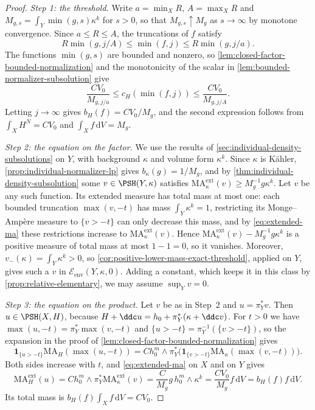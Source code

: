 \begin{proof}
\emph{Step 1: the threshold.} Write $a=\min_XR$, $A=\max_XR$ and $M_{g,s}=\int_Y\min(g,s)\kappa^k$ for $s>0$, so that $M_{g,s}\uparrow M_g$ as $s\to\infty$ by monotone convergence. Since $a\leq R\leq A$, the truncations of $f$ satisfy
\[
 R\min(g,j/A)\leq\min(f,j)\leq R\min(g,j/a).
\]
The functions $\min(g,s)$ are bounded and nonzero, so \cref{lem:closed-factor-bounded-normalization} and the monotonicity of the scalar in \cref{lem:bounded-normalizer-subsolution} give
\[
 \frac{CV_0}{M_{g,j/a}}\leq c_H(\min(f,j))\leq\frac{CV_0}{M_{g,j/A}}.
\]
Letting $j\to\infty$ gives $b_H(f)=CV_0/M_g$, and the second expression follows from $\int_XH^N=CV_0$ and $\int_Xf\,\mathrm{d}V=M_g$.

\emph{Step 2: the equation on the factor.} We use the results of \cref{sec:individual-density-subsolutions} on $Y$, with background $\kappa$ and volume form $\kappa^k$. Since $\kappa$ is K\"ahler, \cref{prop:individual-normalizer-lp} gives $b_\kappa(g)=1/M_g$, and by \cref{thm:individual-density-subsolution} some $v\in\PSH(Y,\kappa)$ satisfies $\mathrm{MA}^{\mathrm{ext}}_\kappa(v)\geq M_g^{-1}g\kappa^k$. Let $v$ be any such function. Its extended measure has total mass at most one: each bounded truncation $\max(v,-t)$ has mass $\int_Y\kappa^k=1$, restricting its Monge--Amp\`ere measure to $\{v>-t\}$ can only decrease this mass, and by \eqref{eq:extended-ma} these restrictions increase to $\mathrm{MA}^{\mathrm{ext}}_\kappa(v)$. Hence $\mathrm{MA}^{\mathrm{ext}}_\kappa(v)-M_g^{-1}g\kappa^k$ is a positive measure of total mass at most $1-1=0$, so it vanishes. Moreover, $v_-(\kappa)=\int_Y\kappa^k>0$, so \cref{cor:positive-lower-mass-exact-threshold}, applied on $Y$, gives such a $v$ in $\mathcal E_{\mathrm{env}}(Y,\kappa,0)$. Adding a constant, which keeps it in this class by \cref{prop:relative-elementary}, we may assume $\sup_Yv=0$.

\emph{Step 3: the equation on the product.} Let $v$ be as in Step~2 and $u=\pi_Y^*v$. Then $u\in\PSH(X,H)$, because $H+\ddc u=h_0+\pi_Y^*(\kappa+\ddc v)$. For $t>0$ we have $\max(u,-t)=\pi_Y^*\max(v,-t)$ and $\{u>-t\}=\pi_Y^{-1}(\{v>-t\})$, so the expansion in the proof of \cref{lem:closed-factor-bounded-normalization} gives
\[
 \mathbf1_{\{u>-t\}}\mathrm{MA}_H(\max(u,-t))
 =Ch_0^m\wedge\pi_Y^*\bigl(\mathbf1_{\{v>-t\}}\mathrm{MA}_\kappa(\max(v,-t))\bigr).
\]
Both sides increase with $t$, and \eqref{eq:extended-ma} on $X$ and on $Y$ gives
\[
 \mathrm{MA}^{\mathrm{ext}}_H(u)=Ch_0^m\wedge\pi_Y^*\mathrm{MA}^{\mathrm{ext}}_\kappa(v)
 =\frac{C}{M_g}g\,h_0^m\wedge\kappa^k=\frac{CV_0}{M_g}f\,\mathrm{d}V
 =b_H(f)f\,\mathrm{d}V.
\]
Its total mass is $b_H(f)\int_Xf\,\mathrm{d}V=CV_0$.


\end{proof}
